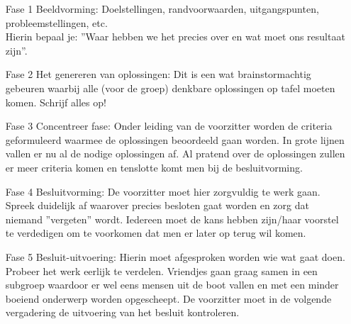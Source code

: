 \begin{itemize}
\item[Fase 1]  Beeldvorming:
          Doelstellingen, randvoorwaarden, uitgangspunten, probleemstellingen, etc.\\
	  Hierin bepaal je: ''Waar hebben we het precies over en wat moet ons resultaat zijn''.
\item[Fase 2]  Het genereren van oplossingen:
          Dit is een wat brainstormachtig gebeuren waarbij
          alle (voor de groep) denkbare oplossingen op tafel
          moeten komen. Schrijf alles op!
\item[Fase 3]  Concentreer fase:
          Onder leiding van de voorzitter worden de criteria
          geformuleerd waarmee de oplossingen beoordeeld gaan
          worden. In grote lijnen vallen er nu al de nodige
          oplossingen af. Al pratend over de oplossingen zullen er meer criteria komen en tenslotte komt men bij de besluitvorming.
\item[Fase 4]  Besluitvorming:
          De voorzitter moet hier zorgvuldig te werk gaan.
          Spreek duidelijk af waarover precies besloten gaat
          worden en zorg dat niemand ''vergeten'' wordt.
          Iedereen moet de kans hebben zijn/haar voorstel te
          verdedigen om te voorkomen dat men er later op terug
          wil komen.
\item[Fase 5]  Besluit-uitvoering:
          Hierin moet afgesproken worden wie wat gaat doen.
          Probeer het werk eerlijk te verdelen. Vriendjes gaan
          graag samen in een subgroep waardoor er wel eens
          mensen uit de boot vallen en met een minder boeiend
          onderwerp worden opgescheept.
          De voorzitter moet in de volgende vergadering de
          uitvoering van het besluit kontroleren.
\end{itemize}

